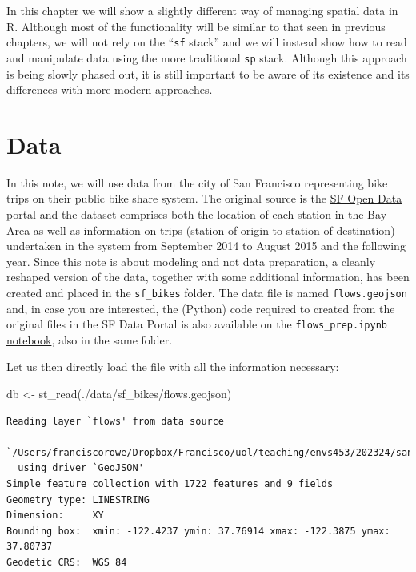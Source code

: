 \documentclass[
  letterpaper,
  DIV=11,
  numbers=noendperiod,
  oneside]{scrreprt}
\newenvironment{Shaded}{\begin{snugshade}}{\end{snugshade}}
\newcommand{\FunctionTok}[1]{\textcolor[rgb]{0.28,0.35,0.67}{#1}}
\newcommand{\NormalTok}[1]{\textcolor[rgb]{0.00,0.23,0.31}{#1}}
\newcommand{\OtherTok}[1]{\textcolor[rgb]{0.00,0.23,0.31}{#1}}
\newcommand{\StringTok}[1]{\textcolor[rgb]{0.13,0.47,0.30}{#1}}
\begin{document}
In this chapter we will show a slightly different way of managing
spatial data in R. Although most of the functionality will be similar to
that seen in previous chapters, we will not rely on the ``\texttt{sf}
stack'' and we will instead show how to read and manipulate data using
the more traditional \texttt{sp} stack. Although this approach is being
slowly phased out, it is still important to be aware of its existence
and its differences with more modern approaches.

\section{Data}\label{data-1}

In this note, we will use data from the city of San Francisco
representing bike trips on their public bike share system. The original
source is the \href{https://datasf.org/opendata/}{SF Open Data portal}
and the dataset comprises both the location of each station in the Bay
Area as well as information on trips (station of origin to station of
destination) undertaken in the system from September 2014 to August 2015
and the following year. Since this note is about modeling and not data
preparation, a cleanly reshaped version of the data, together with some
additional information, has been created and placed in the
\texttt{sf\_bikes} folder. The data file is named \texttt{flows.geojson}
and, in case you are interested, the (Python) code required to created
from the original files in the SF Data Portal is also available on the
\texttt{flows\_prep.ipynb}
\href{https://github.com/darribas/spa_notes/blob/master/sf_bikes/flows_prep.ipynb}{notebook},
also in the same folder.

Let us then directly load the file with all the information necessary:

\begin{Shaded}
\begin{Highlighting}[]
\NormalTok{db }\OtherTok{\textless{}{-}} \FunctionTok{st\_read}\NormalTok{(}\StringTok{\textquotesingle{}./data/sf\_bikes/flows.geojson\textquotesingle{}}\NormalTok{)}
\end{Highlighting}
\end{Shaded}

\begin{verbatim}
Reading layer `flows' from data source 
  `/Users/franciscorowe/Dropbox/Francisco/uol/teaching/envs453/202324/san/data/sf_bikes/flows.geojson' 
  using driver `GeoJSON'
Simple feature collection with 1722 features and 9 fields
Geometry type: LINESTRING
Dimension:     XY
Bounding box:  xmin: -122.4237 ymin: 37.76914 xmax: -122.3875 ymax: 37.80737
Geodetic CRS:  WGS 84
\end{verbatim}
\end{document}
